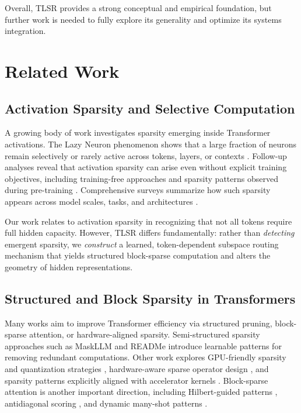 \documentclass{article}
\theoremstyle{plain}
\theoremstyle{definition}
\theoremstyle{remark}
\begin{document}
Overall, TLSR provides a strong conceptual and empirical foundation, but
further work is needed to fully explore its generality and optimize its
systems integration.

\section{Related Work}

\subsection{Activation Sparsity and Selective Computation}
A growing body of work investigates sparsity emerging inside Transformer
activations.
The Lazy Neuron phenomenon shows that a large fraction of neurons remain
selectively or rarely active across tokens, layers, or contexts
\citep{li2023lazyneuron}.
Follow-up analyses reveal that activation sparsity can arise even without
explicit training objectives, including training-free approaches
\citep{liu2024trainingfreeactivationsparsitylarge} and sparsity patterns
observed during pre-training \citep{zhang2024activationsparsitypretrain}.
Comprehensive surveys summarize how such sparsity appears across model
scales, tasks, and architectures \citep{farina2024sparsitysurvey}.

Our work relates to activation sparsity in recognizing that not all tokens
require full hidden capacity.
However, TLSR differs fundamentally: rather than \emph{detecting} emergent
sparsity, we \emph{construct} a learned, token-dependent subspace routing
mechanism that yields structured block-sparse computation and alters the
geometry of hidden representations.

\subsection{Structured and Block Sparsity in Transformers}
Many works aim to improve Transformer efficiency via structured pruning,
block-sparse attention, or hardware-aligned sparsity.
Semi-structured sparsity approaches such as MaskLLM
\citep{fang2024maskllm} and READMe \citep{zheng2024readme} introduce learnable
patterns for removing redundant computations.
Other work explores GPU-friendly sparsity and quantization strategies
\citep{yu2023gpusqtlm}, hardware-aware sparse operator design
\citep{shen2024hardwareaware}, and sparsity patterns explicitly aligned with
accelerator kernels \citep{yuan2025nativesparse}.
Block-sparse attention is another important direction, including
Hilbert-guided patterns \citep{li2025hilbertlocal},
antidiagonal scoring \citep{xu2025xattention}, and dynamic many-shot
patterns \citep{xiao2025dbsa}.
\end{document}
